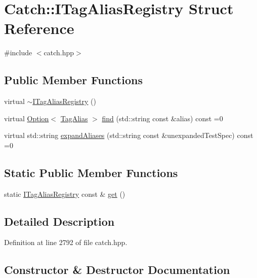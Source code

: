\hypertarget{struct_catch_1_1_i_tag_alias_registry}{}\section{Catch\+:\+:I\+Tag\+Alias\+Registry Struct Reference}
\label{struct_catch_1_1_i_tag_alias_registry}


{\ttfamily \#include $<$catch.\+hpp$>$}

\subsection*{Public Member Functions}
\begin{DoxyCompactItemize}
\item 
virtual \hyperlink{struct_catch_1_1_i_tag_alias_registry_a8967db4dd40b68e22697eff0f4928239}{$\sim$\+I\+Tag\+Alias\+Registry} ()
\item 
virtual \hyperlink{class_catch_1_1_option}{Option}$<$ \hyperlink{struct_catch_1_1_tag_alias}{Tag\+Alias} $>$ \hyperlink{struct_catch_1_1_i_tag_alias_registry_a7d2fba4d39cfcc62c2695fcde4f989c3}{find} (std\+::string const \&alias) const =0
\item 
virtual std\+::string \hyperlink{struct_catch_1_1_i_tag_alias_registry_ae729a7532faf7466db1a157ce0395170}{expand\+Aliases} (std\+::string const \&unexpanded\+Test\+Spec) const =0
\end{DoxyCompactItemize}
\subsection*{Static Public Member Functions}
\begin{DoxyCompactItemize}
\item 
static \hyperlink{struct_catch_1_1_i_tag_alias_registry}{I\+Tag\+Alias\+Registry} const  \& \hyperlink{struct_catch_1_1_i_tag_alias_registry_aa9d0f008f49473389c7abf6071f137a7}{get} ()
\end{DoxyCompactItemize}


\subsection{Detailed Description}


Definition at line 2792 of file catch.\+hpp.



\subsection{Constructor \& Destructor Documentation}
\hypertarget{struct_catch_1_1_i_tag_alias_registry_a8967db4dd40b68e22697eff0f4928239}{}\label{struct_catch_1_1_i_tag_alias_registry_a8967db4dd40b68e22697eff0f4928239} 
